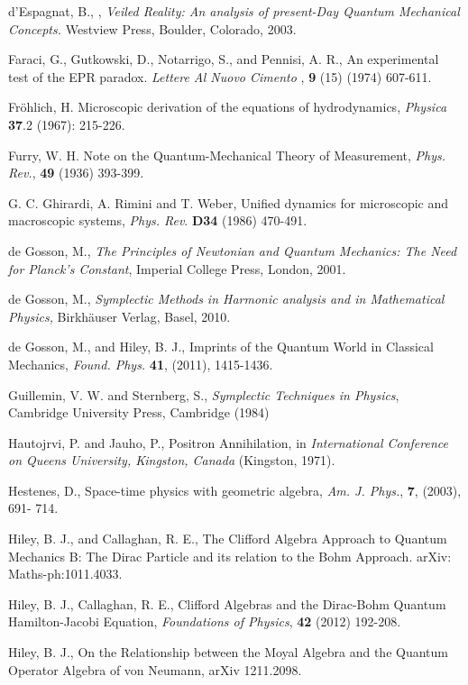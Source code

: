 \documentclass[12pt]{article}
\begin{document}
\begin{thebibliography}{99}
 d'Espagnat, B., , {\em Veiled Reality: An analysis of present-Day Quantum Mechanical Concepts.} Westview Press, Boulder, Colorado, 2003.

 Faraci, G., Gutkowski, D., Notarrigo, S., and  Pennisi, A. R., An experimental test of the EPR paradox. {\em Lettere Al Nuovo Cimento} , {\bf 9} (15) (1974) 607-611.



 Fr\"{o}hlich, H. Microscopic derivation of the equations of hydrodynamics,  {\em Physica} {\bf 37}.2 (1967): 215-226.

 Furry, W. H. Note on the Quantum-Mechanical Theory of Measurement, {\em Phys. Rev.}, {\bf 49} (1936) 393-399.

  G. C. Ghirardi, A. Rimini and T. Weber, Unified dynamics for microscopic and macroscopic systems, {\em Phys. Rev}. {\bf D34} (1986) 470-491.
 
 de Gosson, M., { \em The Principles of Newtonian and Quantum Mechanics: The Need for Planck's Constant}, Imperial College Press, London, 2001.

 de Gosson, M., {\em Symplectic Methods in Harmonic analysis and in Mathematical Physics,} Birkh\"{a}user Verlag, Basel, 2010.

  de Gosson, M., and Hiley, B. J., Imprints of the Quantum World in Classical Mechanics, {\em Found. Phys.} {\bf 41}, (2011), 1415-1436.

 Guillemin, V. W. and Sternberg, S., {\em Symplectic Techniques in Physics}, Cambridge University Press, Cambridge  (1984)

 Hautojrvi, P. and  Jauho, P., Positron Annihilation, in {\em International Conference on Queens University, Kingston, Canada} (Kingston, 1971).

 Hestenes, D., Space-time physics with geometric algebra,  {\em Am. J. Phys.}, {\bf 7}, (2003), 691- 714.


 Hiley, B. J., and Callaghan, R. E., The Clifford Algebra Approach to Quantum Mechanics B: The Dirac Particle and its relation to the Bohm Approach. arXiv: Maths-ph:1011.4033.

 Hiley, B. J., Callaghan, R. E., Clifford Algebras and the Dirac-Bohm Quantum Hamilton-Jacobi Equation, {\em Foundations of Physics}, {\bf 42} (2012) 192-208.

 Hiley, B. J., On the Relationship between the Moyal Algebra and the Quantum Operator Algebra of von Neumann, arXiv 1211.2098.


\end{thebibliography}
\end{document}

